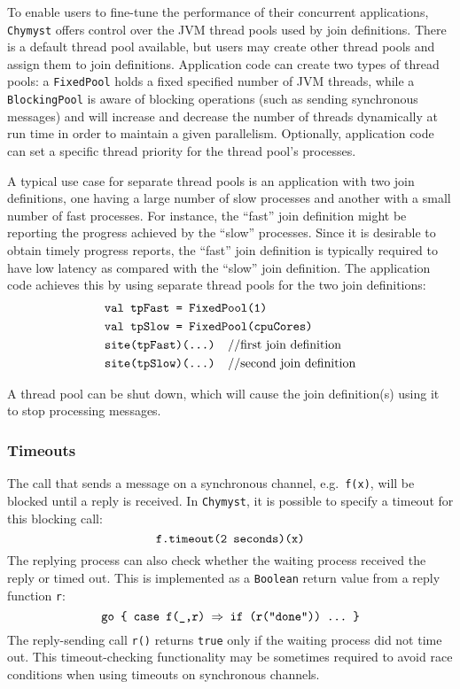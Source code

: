 \documentclass[sigplan,10pt]{acmart}\settopmatter{}
\begin{document}
To enable users to fine-tune the performance of their concurrent applications,
\texttt{Chymyst} offers control over the JVM thread pools used by
join definitions. There is a default thread pool available, but users
may create other thread pools and assign them to join definitions.
Application code can create two types of thread pools: a \texttt{FixedPool}
holds a fixed specified number of JVM threads, while a \texttt{BlockingPool}
is aware of blocking operations (such as sending synchronous messages)
and will increase and decrease the number of threads dynamically at
run time in order to maintain a given parallelism. Optionally, application
code can set a specific thread priority for the thread pool's processes.

A typical use case for separate thread pools is an application with
two join definitions, one having a large number of slow processes
and another with a small number of fast processes. For instance, the
``fast'' join definition might be reporting the progress achieved
by the ``slow'' processes. Since it is desirable to obtain timely
progress reports, the ``fast'' join definition is typically required
to have low latency as compared with the ``slow'' join definition.
The application code achieves this by using separate thread pools
for the two join definitions:
\begin{align*}
 & \text{\texttt{val tpFast = FixedPool(1)}}\\
 & \text{\texttt{val tpSlow = FixedPool(cpuCores)}}\\
 & \text{\texttt{site(tpFast)(...) \textnormal{//first join definition}}}\\
 & \text{\texttt{site(tpSlow)(...) \textnormal{//second join definition}}}
\end{align*}

A thread pool can be shut down, which will cause the join definition(s)
using it to stop processing messages.

\subsubsection{Timeouts}

The call that sends a message on a synchronous channel,
e.g.~\texttt{f(x)}, will be blocked until a reply is received. In
\texttt{Chymyst}, it is possible to specify a timeout for this blocking
call: 
\[
\text{\texttt{f.timeout(2 seconds)(x)}}
\]
The replying process can also check whether the waiting
process received the reply or timed out. This is implemented
as a \texttt{Boolean} return value from a reply function \texttt{r}:
\[
\text{\texttt{go \{ case f(\_,r) \ensuremath{\Rightarrow} if (r("done")) ...~\}}}
\]
The reply-sending call \texttt{r()} returns \texttt{true} only if
the waiting process did not time out. This timeout-checking functionality
may be sometimes required to avoid race conditions when using timeouts
on synchronous channels.
\end{document}
